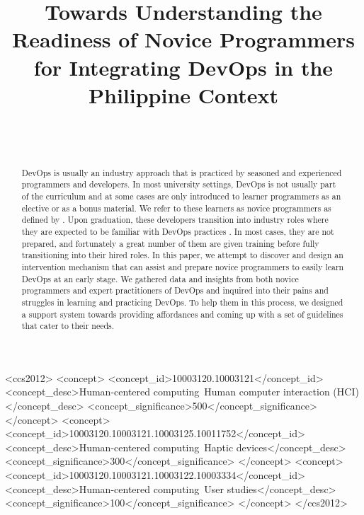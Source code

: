 \documentclass{sigchi}
\def\plaintitle{Towards Understanding the Readiness of Novice Programmers for Integrating DevOps in the Philippine Context}
\begin{document}
\title{\plaintitle}

\author{%
  \\
  \\
}

\maketitle

\begin{abstract}
DevOps is usually an industry approach that is practiced by seasoned and experienced programmers and developers. In most university settings, DevOps is not usually part of the curriculum and at some cases are only introduced to learner programmers as an elective or as a bonus material. We refer to these learners as novice programmers as defined by \cite{mccarthygame}. Upon graduation, these developers transition into industry roles where they are expected to be familiar with DevOps practices \cite{scaffidi2018employers}. In most cases, they are not prepared, and fortunately a great number of them are given training before fully transitioning into their hired roles. In this paper, we attempt to discover and design an intervention mechanism that can assist and prepare novice programmers to easily learn DevOps at an early stage. We gathered data and insights from both novice programmers and expert practitioners of DevOps and inquired into their pains and struggles in learning and practicing DevOps. To help them in this process, we designed a support system towards providing affordances and coming up with a set of guidelines that cater to their needs.
\end{abstract}

\begin{CCSXML}
<ccs2012>
<concept>
<concept_id>10003120.10003121</concept_id>
<concept_desc>Human-centered computing~Human computer interaction (HCI)</concept_desc>
<concept_significance>500</concept_significance>
</concept>
<concept>
<concept_id>10003120.10003121.10003125.10011752</concept_id>
<concept_desc>Human-centered computing~Haptic devices</concept_desc>
<concept_significance>300</concept_significance>
</concept>
<concept>
<concept_id>10003120.10003121.10003122.10003334</concept_id>
<concept_desc>Human-centered computing~User studies</concept_desc>
<concept_significance>100</concept_significance>
</concept>
</ccs2012>
\end{CCSXML}
\end{document}
